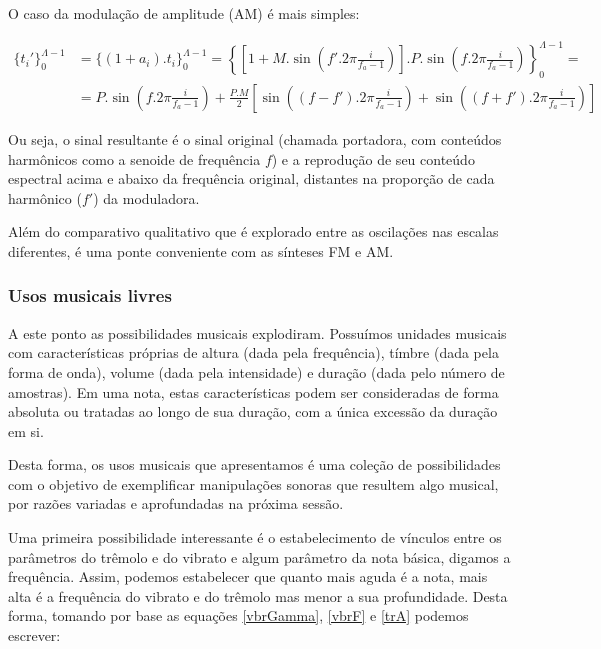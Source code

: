O caso da modulação de amplitude (AM) é mais simples:

\begin{equation}\label{eq:am}
\begin{split}
\{t_i'\}_0^{\Lambda-1} & =\{(1+a_i) . t_i\}_0^{\Lambda-1}= \left \{ \left [ 1+M.\sin \left ( f'.2\pi\frac{i}{f_a -1} \right ) \right] . P .\sin \left ( f.2\pi\frac{i}{f_a -1} \right ) \right \}_0^{\Lambda-1} = \\
& = P.\sin \left( f.2\pi\frac{i}{f_a -1}  \right ) + \frac{P.M}{2} \left [ \sin \left( (f-f').2\pi\frac{i}{f_a -1}  \right ) + \sin \left( (f+f').2\pi\frac{i}{f_a -1}  \right ) \right ]
\end{split}
\end{equation}

Ou seja, o sinal resultante é o sinal original (chamada portadora, com conteúdos harmônicos como a senoide de frequência $f$)
e a reprodução de seu conteúdo espectral acima e abaixo da frequência
original, distantes na proporção de cada harmônico ($f'$) da moduladora.

 Além do comparativo qualitativo que é explorado entre as oscilações nas escalas diferentes, é uma ponte conveniente com as sínteses FM e AM.

\subsubsection{Usos musicais livres}
A este ponto as possibilidades musicais explodiram. Possuímos unidades
musicais com características próprias de altura (dada pela frequência),
tímbre (dada pela forma de onda),
volume (dada pela intensidade) e duração (dada pelo número de amostras).
Em uma nota, estas características podem ser consideradas
de forma absoluta ou tratadas ao longo de sua duração,
com a única excessão da duração em si.

Desta forma, os usos musicais que apresentamos é uma coleção de possibilidades
com o objetivo de exemplificar manipulações sonoras que resultem algo
musical, por razões variadas e aprofundadas na próxima sessão.

Uma primeira possibilidade interessante é o estabelecimento de vínculos
entre os parâmetros do trêmolo e do vibrato e algum parâmetro da nota básica,
digamos a frequência. Assim, podemos estabelecer que quanto mais aguda é a nota,
mais alta é a frequência do vibrato e do trêmolo mas menor a sua profundidade.
Desta forma, tomando por base as equações \ref{vbrGamma}, \ref{vbrF} e \ref{trA}
podemos escrever:

